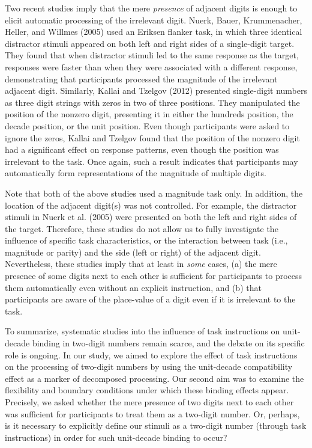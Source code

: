 \documentclass[english,man]{apa6}
\theoremstyle{definition}
\theoremstyle{definition}
\theoremstyle{definition}
\theoremstyle{remark}
\begin{document}
Two recent studies imply that the mere \emph{presence} of adjacent
digits is enough to elicit automatic processing of the irrelevant digit.
Nuerk, Bauer, Krummenacher, Heller, and Willmes (2005) used an Eriksen
flanker task, in which three identical distractor stimuli appeared on
both left and right sides of a single-digit target. They found that when
distractor stimuli led to the same response as the target, responses
were faster than when they were associated with a different response,
demonstrating that participants processed the magnitude of the
irrelevant adjacent digit. Similarly, Kallai and Tzelgov (2012)
presented single-digit numbers as three digit strings with zeros in two
of three positions. They manipulated the position of the nonzero digit,
presenting it in either the hundreds position, the decade position, or
the unit position. Even though participants were asked to ignore the
zeros, Kallai and Tzelgov found that the position of the nonzero digit
had a significant effect on response patterns, even though the position
was irrelevant to the task. Once again, such a result indicates that
participants may automatically form representations of the magnitude of
multiple digits.

Note that both of the above studies used a magnitude task only. In
addition, the location of the adjacent digit(s) was not controlled. For
example, the distractor stimuli in Nuerk et al. (2005) were presented on
both the left and right sides of the target. Therefore, these studies do
not allow us to fully investigate the influence of specific task
characteristics, or the interaction between task (i.e., magnitude or
parity) and the side (left or right) of the adjacent digit.
Nevertheless, these studies imply that at least in \emph{some} cases,
(a) the mere presence of some digits next to each other is sufficient
for participants to process them automatically even without an explicit
instruction, and (b) that participants are aware of the place-value of a
digit even if it is irrelevant to the task.

To summarize, systematic studies into the influence of task instructions
on unit-decade binding in two-digit numbers remain scarce, and the
debate on its specific role is ongoing. In our study, we aimed to
explore the effect of task instructions on the processing of two-digit
numbers by using the unit-decade compatibility effect as a marker of
decomposed processing. Our second aim was to examine the flexibility and
boundary conditions under which these binding effects appear. Precisely,
we asked whether the mere presence of two digits next to each other was
sufficient for participants to treat them as a two-digit number. Or,
perhaps, is it necessary to explicitly define our stimuli as a two-digit
number (through task instructions) in order for such unit-decade binding
to occur?
\end{document}
